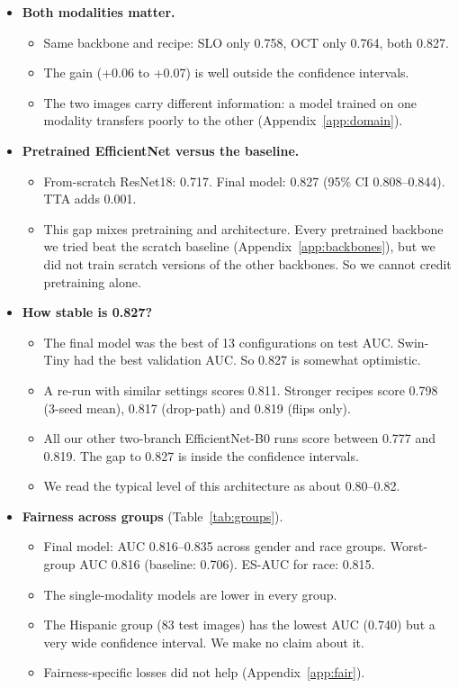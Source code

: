 \documentclass[11pt]{article}
\begin{document}
\begin{itemize}
\item \textbf{Both modalities matter.}
  \begin{itemize}
  \item Same backbone and recipe: SLO only 0.758, OCT only 0.764, both 0.827.
  \item The gain (+0.06 to +0.07) is well outside the confidence intervals.
  \item The two images carry different information: a model trained on one modality transfers poorly to the other (Appendix~\ref{app:domain}).
  \end{itemize}
\item \textbf{Pretrained EfficientNet versus the baseline.}
  \begin{itemize}
  \item From-scratch ResNet18: 0.717. Final model: 0.827 (95\% CI 0.808--0.844). TTA adds 0.001.
  \item This gap mixes pretraining and architecture. Every pretrained backbone we tried beat the scratch baseline (Appendix~\ref{app:backbones}), but we did not train scratch versions of the other backbones. So we cannot credit pretraining alone.
  \end{itemize}
\item \textbf{How stable is 0.827?}
  \begin{itemize}
  \item The final model was the best of 13 configurations on test AUC. Swin-Tiny had the best validation AUC. So 0.827 is somewhat optimistic.
  \item A re-run with similar settings scores 0.811. Stronger recipes score 0.798 (3-seed mean), 0.817 (drop-path) and 0.819 (flips only).
  \item All our other two-branch EfficientNet-B0 runs score between 0.777 and 0.819. The gap to 0.827 is inside the confidence intervals.
  \item We read the typical level of this architecture as about 0.80--0.82.
  \end{itemize}
\item \textbf{Fairness across groups} (Table~\ref{tab:groups}).
  \begin{itemize}
  \item Final model: AUC 0.816--0.835 across gender and race groups. Worst-group AUC 0.816 (baseline: 0.706). ES-AUC for race: 0.815.
  \item The single-modality models are lower in every group.
  \item The Hispanic group (83 test images) has the lowest AUC (0.740) but a very wide confidence interval. We make no claim about it.
  \item Fairness-specific losses did not help (Appendix~\ref{app:fair}).
  \end{itemize}
\end{itemize}
\end{document}
